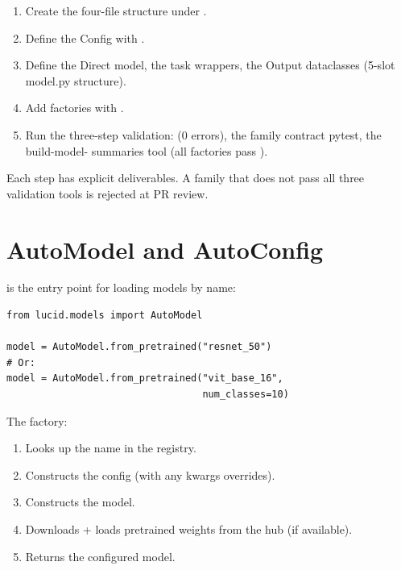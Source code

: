 \begin{enumerate}
  \item Create the four-file structure under
    .
  \item Define the Config with
    .
  \item Define the Direct model, the task wrappers, the Output
    dataclasses (5-slot model.py structure).
  \item Add factories with
    .
  \item Run the three-step validation:
    (0 errors), the family contract pytest, the build-model-
    summaries tool (all factories pass ).
\end{enumerate}

Each step has explicit deliverables. A family that does not pass
all three validation tools is rejected at PR review.

\section{AutoModel and AutoConfig}
\label{sec:zoo_architecture:auto}

 is the entry point for loading
models by name:

\begin{lstlisting}[style=lucid,language=LucidPython]
from lucid.models import AutoModel

model = AutoModel.from_pretrained("resnet_50")
# Or:
model = AutoModel.from_pretrained("vit_base_16",
                                  num_classes=10)
\end{lstlisting}

The factory:
\begin{enumerate}
  \item Looks up the name in the registry.
  \item Constructs the config (with any kwargs overrides).
  \item Constructs the model.
  \item Downloads + loads pretrained weights from the hub (if
    available).
  \item Returns the configured model.
\end{enumerate}

